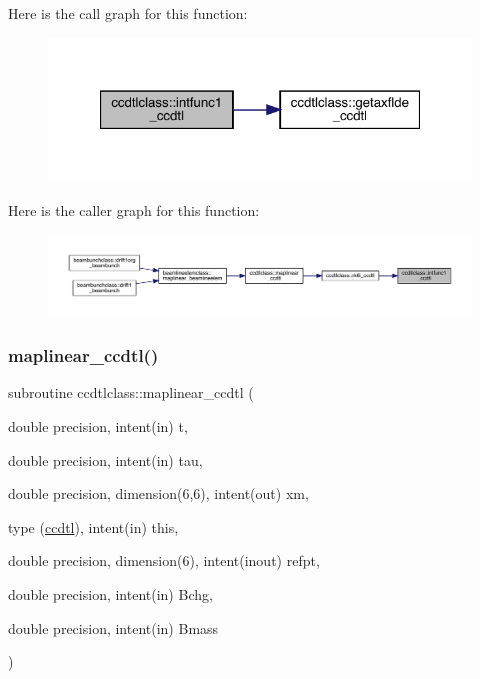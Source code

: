 Here is the call graph for this function\+:\nopagebreak
\begin{figure}[H]
\begin{center}
\leavevmode
\includegraphics[width=321pt]{namespaceccdtlclass_afad7c4471295ba39993a4a180d6a4d54_cgraph}
\end{center}
\end{figure}
Here is the caller graph for this function\+:\nopagebreak
\begin{figure}[H]
\begin{center}
\leavevmode
\includegraphics[width=350pt]{namespaceccdtlclass_afad7c4471295ba39993a4a180d6a4d54_icgraph}
\end{center}
\end{figure}
\mbox{\label{namespaceccdtlclass_a520796b320588e1f31ce8587301b571b}} 
\subsubsection{\texorpdfstring{maplinear\_ccdtl()}{maplinear\_ccdtl()}}
{\footnotesize\ttfamily subroutine ccdtlclass\+::maplinear\+\_\+ccdtl (\begin{DoxyParamCaption}\item[{double precision, intent(in)}]{t,  }\item[{double precision, intent(in)}]{tau,  }\item[{double precision, dimension(6,6), intent(out)}]{xm,  }\item[{type (\mbox{\hyperlink{namespaceccdtlclass_structccdtlclass_1_1ccdtl}{ccdtl}}), intent(in)}]{this,  }\item[{double precision, dimension(6), intent(inout)}]{refpt,  }\item[{double precision, intent(in)}]{Bchg,  }\item[{double precision, intent(in)}]{Bmass }\end{DoxyParamCaption})}

